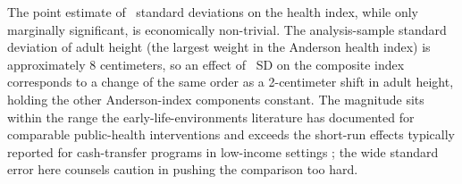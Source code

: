 The point estimate of \CoefHealthCS\ standard deviations on the health index, while only marginally significant, is economically non-trivial. The analysis-sample standard deviation of adult height (the largest weight in the Anderson health index) is approximately 8 centimeters, so an effect of \CoefHealthCS~SD on the composite index corresponds to a change of the same order as a 2-centimeter shift in adult height, holding the other Anderson-index components constant. The magnitude sits within the range the early-life-environments literature has documented for comparable public-health interventions \autocite{duflo2001,maccini2009,ahsan2021} and exceeds the short-run effects typically reported for cash-transfer programs in low-income settings \autocite{premand2022}; the wide standard error here counsels caution in pushing the comparison too hard.

